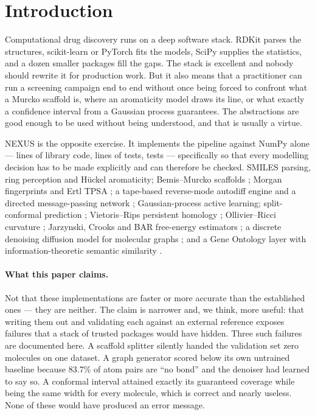 \section{Introduction}

Computational drug discovery runs on a deep software stack. RDKit parses the
structures, scikit-learn or PyTorch fits the models, SciPy supplies the statistics,
and a dozen smaller packages fill the gaps. The stack is excellent and nobody should
rewrite it for production work. But it also means that a practitioner can run a
screening campaign end to end without once being forced to confront what a Murcko
scaffold is, where an aromaticity model draws its line, or what exactly a confidence
interval from a Gaussian process guarantees. The abstractions are good enough to be
used without being understood, and that is usually a virtue.

NEXUS is the opposite exercise. It implements the pipeline against NumPy alone ---
\codeLines{} lines of library code, \testLines{} lines of tests, \nTests{} tests ---
specifically so that every modelling decision has to be made explicitly and can
therefore be checked. SMILES parsing, ring perception and Hückel aromaticity;
Bemis--Murcko scaffolds \cite{bemis1996properties}; Morgan fingerprints
\cite{rogers2010extended} and Ertl TPSA \cite{ertl2000fast}; a tape-based
reverse-mode autodiff engine and a directed message-passing network
\cite{yang2019analyzing}; Gaussian-process active learning; split-conformal
prediction \cite{vovk2005algorithmic,lei2018distribution}; Vietoris--Rips persistent
homology \cite{edelsbrunner2002topological}; Ollivier--Ricci curvature
\cite{ollivier2009ricci}; Jarzynski, Crooks and BAR free-energy estimators
\cite{jarzynski1997nonequilibrium,crooks1999entropy,bennett1976efficient}; a discrete
denoising diffusion model for molecular graphs
\cite{austin2021structured,vignac2023digress}; and a Gene Ontology layer with
information-theoretic semantic similarity \cite{ashburner2000gene,resnik1999semantic}.

\paragraph{What this paper claims.}
Not that these implementations are faster or more accurate than the established
ones --- they are neither. The claim is narrower and, we think, more useful: that
writing them out and validating each against an external reference exposes failures
that a stack of trusted packages would have hidden. Three such failures are
documented here. A scaffold splitter silently handed the validation set zero
molecules on one dataset. A graph generator scored below its own untrained baseline
because 83.7\% of atom pairs are ``no bond'' and the denoiser had learned to say so.
A conformal interval attained exactly its guaranteed coverage while being the same
width for every molecule, which is correct and nearly useless. None of these would
have produced an error message.


